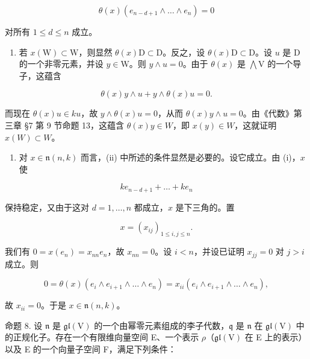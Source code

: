 \[
\theta (x) (e _ {n - d + 1} \wedge \dots \wedge e _ {n}) = 0
\]

对所有 \(1 \leq d \leq n\) 成立。


\begin{enumerate}
\def\labelenumi{(\roman{enumi})}
\tightlist
\item
  若 \(x(\mathrm{W}) \subset \mathrm{W}\)，则显然 \(\theta(x)\mathrm{D} \subset \mathrm{D}\)。反之，设 \(\theta(x)\mathrm{D} \subset \mathrm{D}\)。设 \(u\) 是 \(\mathrm{D}\) 的一个非零元素，并设 \(y \in \mathrm{W}\)。则 \(y \wedge u = 0\)。由于 \(\theta(x)\) 是 \(\bigwedge \mathrm{V}\) 的一个导子，这蕴含
\end{enumerate}

\[
\theta (x) y \wedge u + y \wedge \theta (x) u = 0.
\]

而现在 \(\theta(x)u\in ku\)，故 \(y\wedge\theta(x)u=0\)，从而 \(\theta(x)y\wedge u=0\)。由《代数》第三章 §7 第 9 节命题 13，这蕴含 \(\theta(x)y\in W\)，即 \(x(y)\in W\)，这就证明 \(x(W)\subset W\)。

\begin{enumerate}
\def\labelenumi{(\roman{enumi})}
\setcounter{enumi}{1}
\tightlist
\item
  对 \(x \in \mathfrak{n}(n, k)\) 而言，(ii) 中所述的条件显然是必要的。设它成立。由 (i)，\(x\) 使
\end{enumerate}

\[
k e _ {n - d + 1} + \dots + k e _ {n}
\]

保持稳定，又由于这对 \(d = 1, \ldots, n\) 都成立，\(x\) 是下三角的。置

\[
x = (x _ {i j}) _ {1 \leq i, j \leq n}.
\]

我们有 \(0 = x(e_n) = x_{nn}e_n\)，故 \(x_{nn} = 0\)。设 \(i < n\)，并设已证明 \(x_{jj} = 0\) 对 \(j > i\) 成立。则

\[
0 = \theta (x) \left(e _ {i} \wedge e _ {i + 1} \wedge \dots \wedge e _ {n}\right) = x _ {i i} \left(e _ {i} \wedge e _ {i + 1} \wedge \dots \wedge e _ {n}\right),
\]

故 \(x_{ii} = 0\)。于是 \(x \in \mathfrak{n}(n,k)\)。

命题 8. 设 \(\mathfrak{n}\) 是 \(\mathfrak{gl}(\mathrm{V})\) 的一个由幂零元素组成的李子代数，\(\mathfrak{q}\) 是 \(\mathfrak{n}\) 在 \(\mathfrak{gl}(\mathrm{V})\) 中的正规化子。存在一个有限维向量空间 E、一个表示 \(\rho\)（\(\mathfrak{gl}(\mathrm{V})\) 在 E 上的表示）以及 E 的一个向量子空间 F，满足下列条件：

